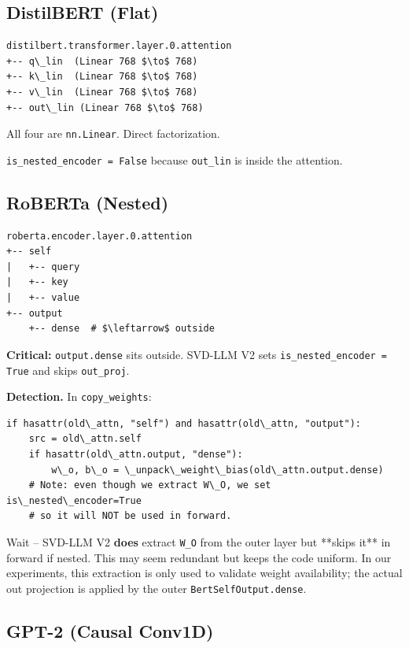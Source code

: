 \subsection{DistilBERT (Flat)}

\begin{lstlisting}
distilbert.transformer.layer.0.attention
+-- q\_lin  (Linear 768 $\to$ 768)
+-- k\_lin  (Linear 768 $\to$ 768)
+-- v\_lin  (Linear 768 $\to$ 768)
+-- out\_lin (Linear 768 $\to$ 768)
\end{lstlisting}

All four are \texttt{nn.Linear}. Direct factorization.

\texttt{is\_nested\_encoder = False} because \texttt{out\_lin} is inside the attention.

\subsection{RoBERTa (Nested)}

\begin{lstlisting}
roberta.encoder.layer.0.attention
+-- self
|   +-- query
|   +-- key
|   +-- value
+-- output
    +-- dense  # $\leftarrow$ outside
\end{lstlisting}

\textbf{Critical:} \texttt{output.dense} sits outside. SVD-LLM V2 sets 
\texttt{is\_nested\_encoder = True} and skips \texttt{out\_proj}.

\textbf{Detection.} In \texttt{copy\_weights}:

\begin{lstlisting}
if hasattr(old\_attn, "self") and hasattr(old\_attn, "output"):
    src = old\_attn.self
    if hasattr(old\_attn.output, "dense"):
        w\_o, b\_o = \_unpack\_weight\_bias(old\_attn.output.dense)
    # Note: even though we extract W\_O, we set is\_nested\_encoder=True
    # so it will NOT be used in forward.
\end{lstlisting}

Wait -- SVD-LLM V2 \textbf{does} extract \texttt{W\_O} from the outer layer but **skips 
it** in forward if nested. This may seem redundant but keeps the code 
uniform. In our experiments, this extraction is only used to validate 
weight availability; the actual out projection is applied by the outer 
\texttt{BertSelfOutput.dense}.

\subsection{GPT-2 (Causal Conv1D)}

